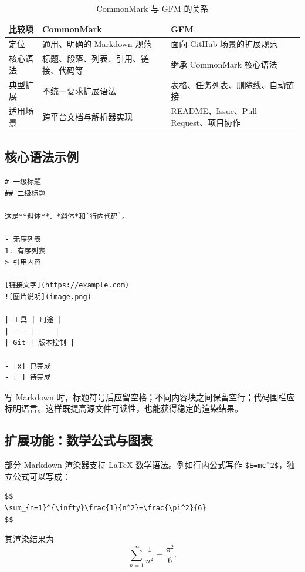 \documentclass[UTF8,zihao=-4,a4paper,fontset=windows]{ctexart}
\begin{document}
\begin{table}[htbp]
\centering
\caption{CommonMark 与 GFM 的关系}
\begin{tabularx}{\textwidth}{C{2.6cm}YY}
\toprule
\textbf{比较项} & \textbf{CommonMark} & \textbf{GFM} \\
\midrule
定位 & 通用、明确的 Markdown 规范 & 面向 GitHub 场景的扩展规范 \\
核心语法 & 标题、段落、列表、引用、链接、代码等 & 继承 CommonMark 核心语法 \\
典型扩展 & 不统一要求扩展语法 & 表格、任务列表、删除线、自动链接 \\
适用场景 & 跨平台文档与解析器实现 & README、Issue、Pull Request、项目协作 \\
\bottomrule
\end{tabularx}
\end{table}

\subsection{核心语法示例}

\begin{lstlisting}[caption={Markdown 常用语法},language={}]
# 一级标题
## 二级标题

这是**粗体**、*斜体*和`行内代码`。

- 无序列表
1. 有序列表
> 引用内容

[链接文字](https://example.com)
![图片说明](image.png)

| 工具 | 用途 |
| --- | --- |
| Git | 版本控制 |

- [x] 已完成
- [ ] 待完成
\end{lstlisting}

写 Markdown 时，标题符号后应留空格；不同内容块之间保留空行；代码围栏应标明语言。这样既提高源文件可读性，也能获得稳定的渲染结果。

\subsection{扩展功能：数学公式与图表}

部分 Markdown 渲染器支持 \LaTeX{} 数学语法。例如行内公式写作 \verb|$E=mc^2$|，独立公式可以写成：

\begin{lstlisting}[caption={Markdown 中的数学公式},language={}]
$$
\sum_{n=1}^{\infty}\frac{1}{n^2}=\frac{\pi^2}{6}
$$
\end{lstlisting}

其渲染结果为
\[
\sum_{n=1}^{\infty}\frac{1}{n^2}=\frac{\pi^2}{6}.
\]
\end{document}
